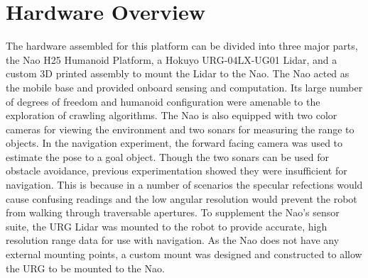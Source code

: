 \section{Hardware Overview}

The hardware assembled for this platform can be divided into three major parts,
the Nao H25 Humanoid Platform, a Hokuyo URG-04LX-UG01 Lidar, and a custom 3D
printed assembly to mount the Lidar to the Nao.
The Nao acted as the mobile base and provided onboard sensing and computation. 
Its large number of degrees of freedom and humanoid configuration were amenable
to the exploration of crawling algorithms.
The Nao is also equipped with two color cameras for viewing the environment
and two sonars for measuring the range to objects.
In the navigation experiment, the forward facing camera was used to estimate
the pose to a goal object.
Though the two sonars can be used for obstacle
avoidance, previous experimentation showed they
were insufficient for navigation. This is because in a number of scenarios the
specular refections would cause confusing readings and the low angular
resolution would prevent the robot from walking through traversable apertures.
To supplement the Nao's sensor suite, the URG Lidar was mounted to the robot
to provide accurate, high resolution range data for use with navigation.
As the Nao does not have any external mounting points, a custom mount was
designed and constructed to allow the URG to be mounted to the Nao.


%

%
%

